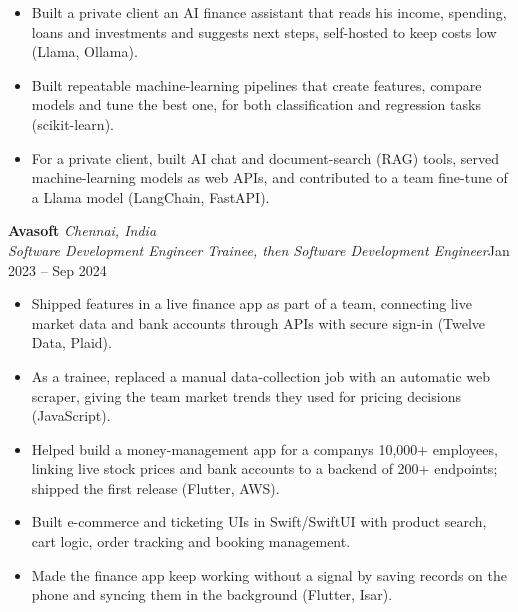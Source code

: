 \documentclass[a4paper,11pt]{article}
\newcommand{\role}[4]{%
  \textbf{#1}{\color{muted}\,\textperiodcentered\,\textit{#2}}\\
  \textit{#4}\hfill{\color{muted}#3}\par}
\newcommand{\gap}{\vspace{5pt}}
\begin{document}
\begin{itemize}
  \item Built a private client an AI finance assistant that reads his income, spending, loans and investments and suggests next steps, self-hosted to keep costs low (Llama, Ollama).
  \item Built repeatable machine-learning pipelines that create features, compare models and tune the best one, for both classification and regression tasks (scikit-learn).
  \item For a private client, built AI chat and document-search (RAG) tools, served machine-learning models as web APIs, and contributed to a team fine-tune of a Llama model (LangChain, FastAPI).
\end{itemize}
\gap
{}
\role{Avasoft}{Chennai, India}{Jan 2023 – Sep 2024}{Software Development Engineer Trainee, then Software Development Engineer}
\begin{itemize}
  \item Shipped features in a live finance app as part of a team, connecting live market data and bank accounts through APIs with secure sign-in (Twelve Data, Plaid).
  \item As a trainee, replaced a manual data-collection job with an automatic web scraper, giving the team market trends they used for pricing decisions (JavaScript).
  \item Helped build a money-management app for a company\textquotesingle{}s 10,000+ employees, linking live stock prices and bank accounts to a backend of 200+ endpoints; shipped the first release (Flutter, AWS).
  \item Built e-commerce and ticketing UIs in Swift/SwiftUI with product search, cart logic, order tracking and booking management.
  \item Made the finance app keep working without a signal by saving records on the phone and syncing them in the background (Flutter, Isar).
\end{itemize}
\end{document}

